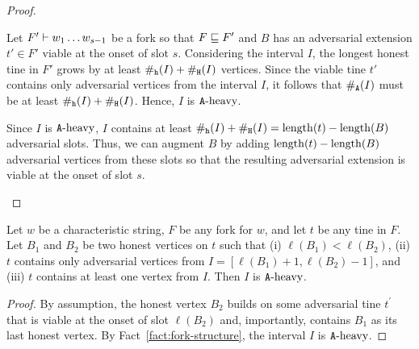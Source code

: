     \begin{proof}~
      \begin{description}[font=\normalfont\itshape\space]
        \item[\ref{fact-part:viable-adv-ext} implies~\ref{fact-part:Aheavy}.]
        Let $F' \vdash w_1 \ldots w_{s-1}$ be 
        a fork so that $F \sqsubseteq F'$ 
        and $B$ has an adversarial extension $t' \in F'$ 
        viable at the onset of slot $s$. 
        Considering the interval $I$, 
        the longest honest tine in $F'$ 
        grows by at least $\#_{\mathtt{h}}(I) + \#_{\mathtt{H}}(I)$ vertices. 
        Since the viable tine $t'$ 
        contains only adversarial vertices from the interval $I$, 
        it follows that $\#_{\mathtt{A}}(I)$ must be at least $\#_{\mathtt{h}}(I) + \#_{\mathtt{H}}(I)$. 
        Hence, $I$ is $\mathtt{A}\text{-heavy}$.

        \item[\ref{fact-part:conservative} and \ref{fact-part:Aheavy} implies~\ref{fact-part:viable-adv-ext}.]
        Since $I$ is $\mathtt{A}\text{-heavy}$,  
        $I$ contains at least $\#_{\mathtt{h}}(I) + \#_{\mathtt{H}}(I) = \operatorname{length}(t) - \operatorname{length}(B)$ 
        adversarial slots. 
        Thus, we can augment $B$ by adding 
        $\operatorname{length}(t) - \operatorname{length}(B)$ adversarial vertices 
        from these slots 
        so that 
        the resulting adversarial extension is viable 
        at the onset of slot $s$.
      \end{description}
    \end{proof}






    \begin{corollary}\label{coro:interval-honest-vertices}
      Let $w$ be a characteristic string, 
      $F$ be any fork for $w$, 
      and let $t$ be any tine in $F$.
      Let $B_1$ and $B_2$ be two honest vertices on $t$ such that 
      (i) $\ell(B_1) < \ell(B_2)$, 
      (ii) $t$ contains only adversarial vertices from $I = [\ell(B_1) + 1, \ell(B_2) - 1]$, and 
      (iii) $t$ contains at least one vertex from $I$.
      Then $I$ is $\mathtt{A}\text{-heavy}$. 
    \end{corollary}
    \begin{proof}
      By assumption, 
      the honest vertex $B_2$ builds on some adversarial tine $t^\prime$ 
      that is viable at the onset of slot $\ell(B_2)$ and, importantly, 
      contains $B_1$ as its last honest vertex. 
      By Fact~\ref{fact:fork-structure}, 
      the interval $I$ is $\mathtt{A}\text{-heavy}$.
    \end{proof}
    









